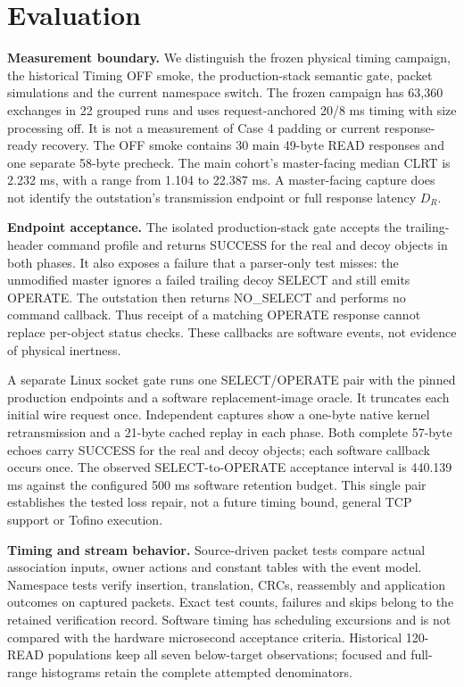 \section{Evaluation}
\textbf{Measurement boundary.} We distinguish the frozen physical timing
campaign, the historical Timing OFF smoke, the production-stack semantic gate,
packet simulations and the current namespace switch. The frozen campaign has
63,360 exchanges in 22 grouped runs and uses request-anchored 20/8 ms timing with
size processing off. It is not a measurement of Case 4 padding or current
response-ready recovery. The OFF smoke contains 30 main 49-byte READ responses
and one separate 58-byte precheck. The main cohort's master-facing median CLRT
is 2.232 ms, with a range from 1.104 to 22.387 ms. A master-facing capture does
not identify the outstation's transmission endpoint or full response latency
$D_R$.

\textbf{Endpoint acceptance.} The isolated production-stack gate accepts the
trailing-header command profile and returns SUCCESS for the real and decoy
objects in both phases. It also exposes a failure that a parser-only test misses:
the unmodified master ignores a failed trailing decoy SELECT and still emits
OPERATE. The outstation then returns NO\_SELECT and performs no command callback.
Thus receipt of a matching OPERATE response cannot replace per-object status
checks. These callbacks are software events, not evidence of physical inertness.

A separate Linux socket gate runs one SELECT/OPERATE pair with the pinned
production endpoints and a software replacement-image oracle. It truncates
each initial wire request once. Independent captures show a one-byte native
kernel retransmission and a 21-byte cached replay in each phase. Both complete
57-byte echoes carry SUCCESS for the real and decoy objects; each software
callback occurs once. The observed SELECT-to-OPERATE acceptance interval is
440.139 ms against the configured 500 ms software retention budget. This single
pair establishes the tested loss repair, not a future timing bound, general TCP
support or Tofino execution.

\textbf{Timing and stream behavior.} Source-driven packet tests compare actual
association inputs, owner actions and constant tables with the event model.
Namespace tests verify insertion, translation, CRCs, reassembly and application
outcomes on captured packets. Exact test counts, failures and skips belong to the
retained verification record. Software timing has scheduling excursions and is
not compared with the hardware microsecond acceptance criteria. Historical
120-READ populations keep all seven below-target observations; focused and
full-range histograms retain the complete attempted denominators.

